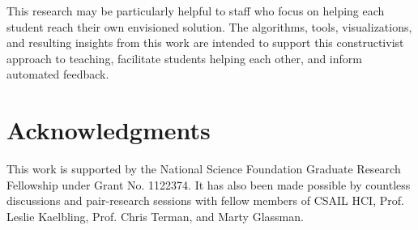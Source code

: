 \documentclass[12pt]{article}
\begin{document}

This research may be particularly helpful to staff who focus on helping each student reach their own envisioned solution. The algorithms, tools, visualizations, and resulting insights from this work are intended to support this constructivist approach to teaching, facilitate students helping each other, and inform automated feedback.

\section{Acknowledgments}
This work is supported by the National Science Foundation Graduate Research Fellowship under Grant No. 1122374. It has also been made possible by countless discussions and pair-research sessions with fellow members of CSAIL HCI, Prof. Leslie Kaelbling, Prof. Chris Terman, and Marty Glassman.




%
\end{document}
